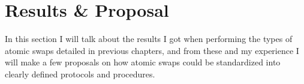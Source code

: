 \chapter{Results \& Proposal}
In this section I will talk about the results I got when performing the types 
of atomic swaps detailed in previous chapters, and from these and my experience 
I will make a few proposals on how atomic swaps could  be standardized into 
clearly defined protocols and procedures. 




